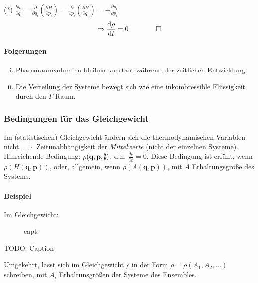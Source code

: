 (*) $\frac{\partial \dot{q}_i}{\partial q_i} = \frac{\partial}{\partial q_i} \left( \frac{\partial H}{\partial p_i} \right) = \frac{\partial}{\partial p_i} \left( \frac{\partial H}{\partial q_i} \right) = - \frac{\partial \dot{p}_i}{\partial p_i}$
\begin{equation}
    \Rightarrow \frac{\mathrm{d} \rho}{\mathrm{d} t} = 0 \qquad \qquad \square
\end{equation}
\paragraph{Folgerungen}
\begin{enumerate}[i)]
    \item Phasenraumvolumina bleiben konstant während der zeitlichen Entwicklung.
    \item Die Verteilung der Systeme bewegt sich wie eine inkombressible Flüssigkeit durch den $\Gamma$-Raum.
\end{enumerate}
\subsubsection{Bedingungen für das Gleichgewicht}
Im (statistischen) Gleichgewicht ändern sich die thermodynamischen Variablen nicht. $\Rightarrow$ Zeitunabhängigkeit der \emph{Mittelwerte}
(nicht der einzelnen Systeme). Hinreichende Bedingung: $\rho(\textbf{q}, \textbf{p}, \xcancel{t})$, d.h. $\frac{\partial \rho}{\partial t} = 0$.
Diese Bedingung ist erfüllt, wenn $\rho(H(\textbf{q}, \textbf{p}))$, oder, allgemein, wenn $\rho(A(\textbf{q}, \textbf{p}))$, mit $A$ Erhaltungsgröße
des Systems.
\paragraph{Beispiel} Im Gleichgewicht:

\begin{figure}[H]
    \centering
    \def\svgwidth{0.5\textwidth}
    
    \caption{capt.}
    \label{img:phaseSpaceBall}
\end{figure}

TODO: Caption %

Umgekehrt, lässt sich im Gleichgewicht $\rho$ in der Form $\rho=\rho(A_1, A_2, \ldots)$ schreiben, mit $A_i$ Erhaltunsgrößen der Systeme des Ensembles.

